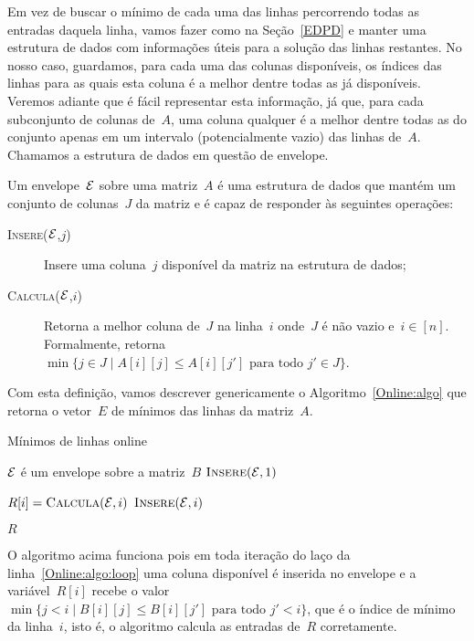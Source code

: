 Em vez de buscar o mínimo de cada uma das linhas percorrendo todas as entradas daquela linha, vamos fazer como na Seção~\ref{EDPD} e manter uma estrutura de dados com informações úteis para a solução das linhas restantes. No nosso caso, guardamos, para cada uma das colunas disponíveis, os índices das linhas para as quais esta coluna é a melhor dentre todas as já disponíveis. Veremos adiante que é fácil representar esta informação, já que, para cada subconjunto de colunas de~$A$, uma coluna qualquer é a melhor dentre todas as do conjunto apenas em um intervalo (potencialmente vazio) das linhas de~$A$. Chamamos a estrutura de dados em questão de envelope.

\begin{defi}
Um envelope~$\mathcal{E}$ sobre uma matriz~$A$ é uma estrutura de dados que mantém um conjunto de colunas~$J$ da matriz e é capaz de responder às seguintes operações:

\begin{description}
    \item[\textsc{Insere}($\mathcal{E}$,$j$)] Insere uma coluna~$j$ disponível da matriz na estrutura de dados;
    \item[\textsc{Calcula}($\mathcal{E}$,$i$)] Retorna a melhor coluna de~$J$ na linha~$i$ onde~$J$ é não vazio e~${ i \in [n] }$. Formalmente, retorna~${ \min\{j \in J \mid A[i][j] \leq A[i][j'] \text{ para todo } j' \in J\} }$.
\end{description}
\end{defi}

Com esta definição, vamos descrever genericamente o Algoritmo~\ref{Online:algo} que retorna o vetor~$E$ de mínimos das linhas da matriz~$A$.

\begin{algorithm}[h]
\caption{Mínimos de linhas online}
\label{Online:algo}
\begin{algorithmic}[1]
    \State $\mathcal{E}$ é um envelope sobre a matriz~$B$
    \State $\textsc{Insere}(\mathcal{E},1)$

     \label{Online:algo:loop}
        \State $R[i] = \textsc{Calcula}(\mathcal{E},i)$
        \State $\textsc{Insere}(\mathcal{E},i)$
    \EndFor

    \State \Return $R$
\EndFunction
\end{algorithmic}
\end{algorithm}

O algoritmo acima funciona pois em toda iteração do laço da linha~\ref{Online:algo:loop} uma coluna disponível é inserida no envelope e a variável~$R[i]$ recebe o valor~$\min\{ j < i \mid B[i][j] \leq B[i][j'] \text{ para todo } j' < i\}$, que é o índice de mínimo da linha~$i$, isto é, o algoritmo calcula as entradas de~$R$ corretamente.

